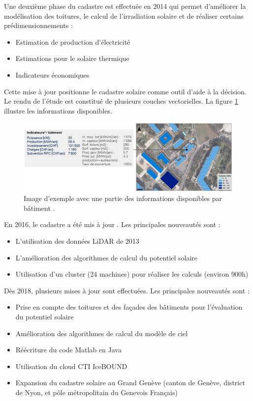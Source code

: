 {\par{Une deuxième phase du cadastre est effectuée en 2014 \cite{desthieux_etude_2014} qui permet d'améliorer la modélisation des toitures, le calcul de l'irradiation solaire et de réaliser certains prédimensionnements :
\begin{itemize}
    \item Estimation de production d'électricité
    \item Estimations pour le solaire thermique
    \item Indicateurs économiques
\end{itemize}}
\par{Cette mise à jour positionne le cadastre solaire comme outil d'aide à la décision. Le rendu de l'étude est constitué de plusieurs couches vectorielles. La figure \ref{fig:cadastre_solaire_2014} illustre les informations disponibles.
\begin{figure}[H]
    \centering
    \includegraphics[width=1\linewidth]{02-main//figures/cadastre_solaire_2014.png}
    \caption{Image d'exemple avec une partie des informations disponibles par bâtiment \cite{desthieux_etude_2014}.}
    \label{fig:cadastre_solaire_2014}
\end{figure}

\par{En 2016, le cadastre a été mis à jour \cite{desthieux_solar_2018}. Les principales nouveautés sont :
\begin{itemize}
    \item L'utilisation des données LiDAR de 2013 \cite{sitg_nuages_2013}
    \item L'amélioration des algorithmes de calcul du potentiel solaire
    \item Utilisation d'un cluster (24 machines) pour réaliser les calculs (environ 900h)
\end{itemize}}

\par{Dès 2018, plusieurs mises à jour \cite{desthieux_solar_2018} sont effectuées. Les principales nouveautés sont :
\begin{itemize}
    \item Prise en compte des toitures et des façades des bâtiments pour l'évaluation du potentiel solaire
    \item Amélioration des algorithmes de calcul du modèle de ciel
    \item Réécriture du code Matlab en Java
    \item Utilisation du cloud CTI IceBOUND
    \item Expansion du cadastre solaire au Grand Genève (canton de Genève, district de Nyon, et pôle métropolitain du Genevois Français)
\end{itemize}}

}}
